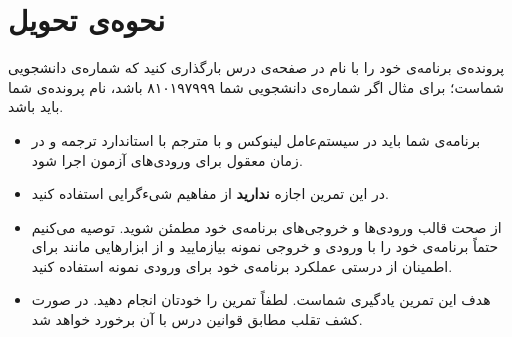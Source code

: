 \documentclass{utap}
\begin{document}
\section{نحوه‌ی تحویل}
    پرونده‌ی برنامه‌ی خود را با نام  در صفحه‌ی  درس بارگذاری کنید که  شماره‌ی دانشجویی شماست؛ برای مثال اگر شماره‌ی دانشجویی شما ۸۱۰۱۹۷۹۹۹ باشد، نام پرونده‌ی شما باید  باشد.
    \begin{itemize}
        \item
برنامه‌ی شما باید در سیستم‌عامل لینوکس و با مترجم  با استاندارد  ترجمه و در زمان معقول برای ورودی‌های آزمون اجرا شود.
        \item
در این تمرین اجازه \textbf{ندارید} از مفاهیم شیءگرایی استفاده کنید.
        \item
از صحت قالب ورودی‌ها و خروجی‌های برنامه‌ی خود مطمئن شوید. توصیه می‌کنیم حتماً برنامه‌ی خود را با ورودی و خروجی نمونه بیازمایید و از ابزارهایی مانند  برای اطمینان از درستی عملکرد برنامه‌ی خود برای ورودی نمونه استفاده کنید.
        \item
هدف این تمرین یادگیری شماست. لطفاً تمرین را خودتان انجام دهید. در صورت کشف تقلب مطابق قوانین درس با آن برخورد خواهد شد.
    \end{itemize}
\end{document}
